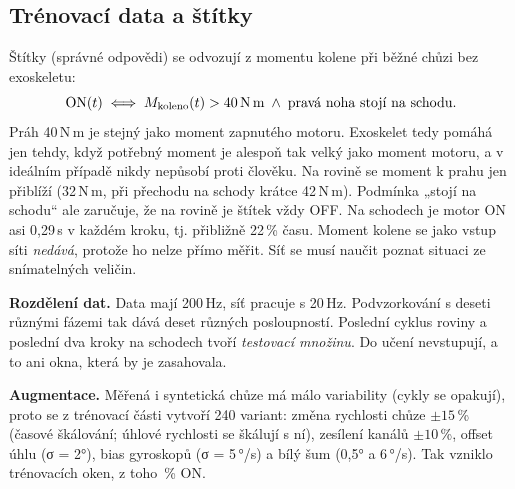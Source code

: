 \documentclass[11pt,a4paper]{article}
\newcommand{\Nm}{\,N\,m}
\newcommand{\pct}{\,\%}
\begin{document}
\subsection{Trénovací data a štítky}
Štítky (správné odpovědi) se odvozují z momentu kolene při běžné chůzi bez exoskeletu:
\begin{equation}
  \text{ON}(t) \iff M_{\text{koleno}}(t) > 40\,\text{N\,m} \;\wedge\; \text{pravá noha stojí na schodu}.
\end{equation}
Práh 40\Nm{} je stejný jako moment zapnutého motoru. Exoskelet tedy pomáhá jen tehdy, když
potřebný moment je alespoň tak velký jako moment motoru, a v ideálním případě nikdy nepůsobí
proti člověku. Na rovině se moment k prahu jen přiblíží (32\Nm, při přechodu na schody krátce 42\Nm). Podmínka
„stojí na schodu“ ale zaručuje, že na rovině je štítek vždy OFF. Na schodech je motor ON
asi 0,29\,s v každém kroku, tj. přibližně 22\pct{} času. Moment kolene se jako vstup síti
\emph{nedává}, protože ho nelze přímo měřit. Síť se musí naučit poznat situaci
ze snímatelných veličin.

\textbf{Rozdělení dat.} Data mají 200\,Hz, síť pracuje s 20\,Hz. Podvzorkování s deseti různými
fázemi tak dává deset různých posloupností. Poslední cyklus roviny a poslední dva kroky
na schodech tvoří \emph{testovací množinu}. Do učení nevstupují, a to ani okna, která
by je zasahovala.

\textbf{Augmentace.} Měřená i syntetická chůze má málo variability (cykly se opakují),
proto se z trénovací části vytvoří 240 variant:
změna rychlosti chůze $\pm15$\pct{} (časové škálování; úhlové rychlosti se škálují s ní),
zesílení kanálů $\pm10$\pct, offset úhlu (σ = 2°), bias gyroskopů (σ = 5\,°/s) a bílý šum
(0,5° a 6\,°/s). Tak vzniklo \CnnOken{} trénovacích oken, z toho \CnnPodilOn\pct{} ON.
\end{document}
